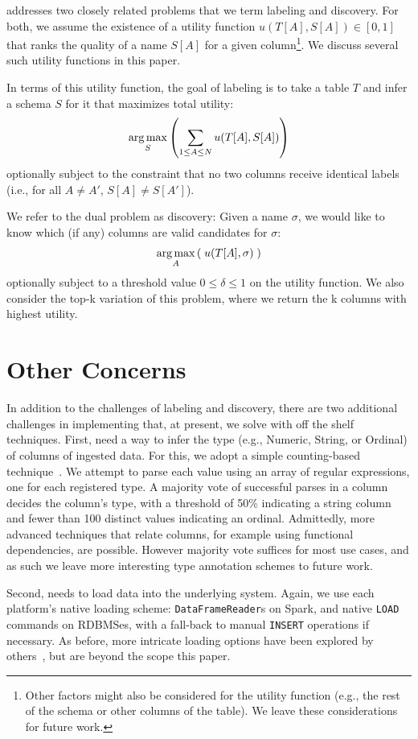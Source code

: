 \systemname addresses two closely related problems that we term labeling and discovery.
For both, we assume the existence of a utility function $u(T[A], S[A]) \in [0, 1]$ that ranks the quality of a name $S[A]$ for a given column\footnote{Other factors might also be considered for the utility function (e.g., the rest of the schema or other columns of the table).  We leave these considerations for future work.}.  
We discuss several such utility functions in this paper.

In terms of this utility function, the goal of labeling is to take a table $T$ and infer a schema $S$ for it that maximizes total utility:
$$\operatorname*{arg\,max}_{S}\left(\sum_{1 \leq A \leq N}u(T[A], S[A])\right)$$ 
optionally subject to the constraint that no two columns receive identical labels (i.e., for all $A \neq A'$, $S[A] \neq S[A']$).

We refer to the dual problem as discovery: Given a name $\sigma$, we would like to know which (if any) columns are valid candidates for $\sigma$:
$$\operatorname*{arg\,max}_{A}\left(\; u(T[A], \sigma)\;\right)$$
optionally subject to a threshold value $0 \leq \delta \leq 1$ on the utility function.  We also consider the top-k variation of this problem, where we return the k columns with highest utility.

\section{Other Concerns}
In addition to the challenges of labeling and discovery, there are two additional challenges in implementing \systemname that, at present, we solve with off the shelf techniques.
First, \systemname need a way to infer the type (e.g., Numeric, String, or Ordinal) of columns of ingested data.  
For this, we adopt a simple counting-based technique~\cite{yang2015lenses}.
We attempt to parse each value using an array of regular expressions, one for each registered type.
A majority vote of successful parses in a column decides the column's type, with a threshold of 50\% indicating a string column and fewer than 100 distinct values indicating an ordinal.
Admittedly, more advanced techniques that relate columns, for example using functional dependencies, are possible.
However majority vote suffices for most use cases, and as such we leave more interesting type annotation schemes to future work.

Second, \systemname needs to load data into the underlying system.  
Again, we use each platform's native loading scheme: \texttt{DataFrameReader}s on Spark, and native \texttt{LOAD} commands on RDBMSes, with a fall-back to manual \texttt{INSERT} operations if necessary.
As before, more intricate loading options have been explored by others~\cite{DBLP:conf/sigmod/AlagiannisBBIA12,DBLP:conf/cidr/IdreosKM07}, but are beyond the scope this paper.






